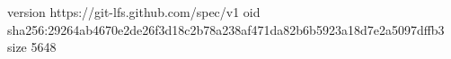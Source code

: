 version https://git-lfs.github.com/spec/v1
oid sha256:29264ab4670e2de26f3d18c2b78a238af471da82b6b5923a18d7e2a5097dffb3
size 5648
